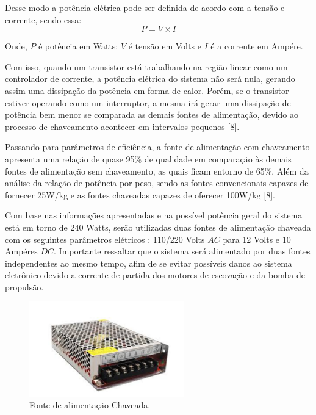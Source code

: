 Desse modo a potência elétrica pode ser definida de acordo com a tensão e corrente, sendo essa:
\begin{equation} \label{eq:potencia}
  P = V \times I
\end{equation}

Onde, $P$ é potência em Watts; $V$ é tensão em Volts e $I$ é a corrente em Ampére.

Com isso, quando um transistor está trabalhando na região linear como um controlador de corrente, a potência elétrica do sistema não será nula, gerando assim uma dissipação da potência em forma de calor. Porém, se o transistor estiver operando como um interruptor, a mesma irá gerar uma dissipação de potência bem menor se comparada as demais fontes de alimentação, devido ao processo de chaveamento acontecer em intervalos pequenos [8].

Passando para parâmetros de eficiência, a fonte de alimentação com chaveamento apresenta uma relação de quase 95\% de qualidade em comparação às demais fontes de alimentação sem chaveamento, as quais ficam entorno de 65\%. Além da análise da relação de potência por peso, sendo as fontes convencionais capazes de fornecer 25W/kg e as fontes chaveadas capazes de oferecer 100W/kg [8].

Com base nas informações apresentadas e na possível potência geral do sistema está em torno de 240 Watts, serão utilizadas duas fontes de alimentação chaveada com os seguintes parâmetros elétricos : 110/220 Volts $AC$ para 12 Volts e 10 Ampéres $DC$. Importante ressaltar que o sistema será alimentado por duas fontes independentes ao mesmo tempo, afim de se evitar possíveis danos ao sistema eletrônico devido a corrente de partida dos motores de escovação e da bomba de propulsão.
\par
\begin{figure}[h]
  \centering
  \includegraphics[width=0.6\textwidth]{figures/power-supply.png}
  \caption{Fonte de alimentação Chaveada.}
  \label{fig:power-supply}
\end{figure}
\FloatBarrier
\par

